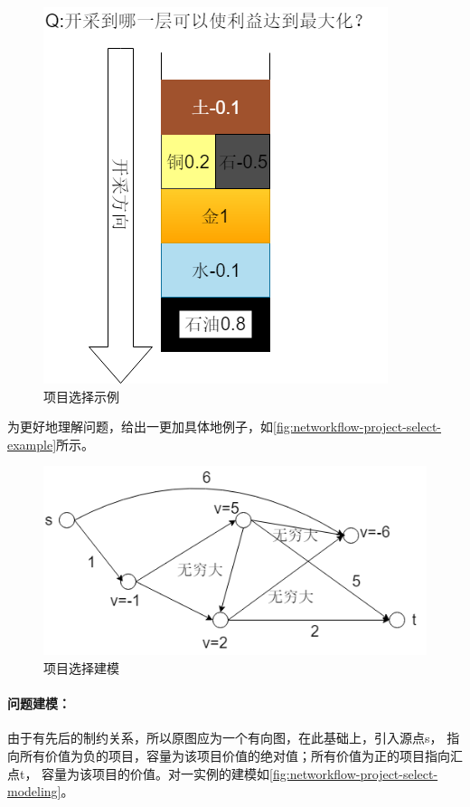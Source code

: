 \begin{figure}[htb]
	\centering
	\includegraphics[scale=0.6]{image/networkflow8.png}
	\caption{项目选择示例}\label{fig:networkflow-project-select-example}
\end{figure}
为更好地理解问题，给出一更加具体地例子，如\autoref{fig:networkflow-project-select-example}所示。
\begin{figure}[htb]
	\centering
	\includegraphics[scale=0.6]{image/networkflow9.png}
	\caption{项目选择建模}\label{fig:networkflow-project-select-modeling}
\end{figure}

\paragraph*{问题建模：}由于有先后的制约关系，所以原图应为一个有向图，在此基础上，引入源点s，
指向所有价值为负的项目，容量为该项目价值的绝对值；所有价值为正的项目指向汇点t，
容量为该项目的价值。对一实例的建模如\autoref{fig:networkflow-project-select-modeling}。

